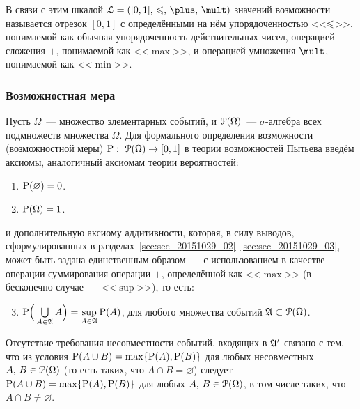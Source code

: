В связи с этим шкалой $\scL = \scale$ значений возможности называется отрезок $[0,1]$ с определёнными на нём упорядоченностью <<$\leqs$>>, понимаемой как обычная упорядоченность действительных чисел, операцией сложения $\plus$, понимаемой как <<$\max$>>, и операцией умножения $\mult$, понимаемой как <<$\min$>>.
\begin{comment}
Пусть ${\{a_1,\, a_2,\, \ldots\}\subset\scL}$~--- последовательность элементов $\scL$. Нижний $\liminf\limits_{i\to\infty} a_i$ и верхний $\limsup\limits_{i\to\infty} a_i$ пределы этой последовательности определяют следующим образом:
\begin{gather*}
    \dst\liminf_{i\to\infty} a_i = \sup_{n=1,\, 2,\, \ldots}\inf_{i\geqs n}a_i,\\
    \dst\limsup_{i\to\infty} a_i = \inf_{n=1,\, 2,\, \ldots}\sup_{i\geqs n}a_i.
\end{gather*}
Если $\liminf\limits_{i\to\infty} a_i = \limsup\limits_{i\to\infty} a_i$, последовательность $\{a_1,\, a_2,\, \ldots\}$ называется сходящейся, а её пределом называется элемент
$$\lim_{i\to\infty} a_i \defeq \liminf_{i\to\infty} a_i = \limsup_{i\to\infty} a_i.$$
\end{comment}

\subsubsection{Возможностная мера}

Пусть $\Omega$~--- множество элементарных событий, и $\Po(\Omega)$~--- $\sigma$-алгебра всех подмножеств множества $\Omega$.
Для формального определения возможности (возможностной меры) $\P:\ \Po(\Omega)\to[0,1]$ в теории возможностей Пытьева введём аксиомы, аналогичный аксиомам теории вероятностей:
\begin{enumerate}
\item\label{item_poss_rel_1}
    $\P(\varnothing) = 0$.
\item\label{item_poss_rel_2}
    $\P(\Omega) = 1$.
\end{enumerate}
и дополнительную аксиому аддитивности, которая, в силу выводов, сформулированных в разделах~\ref{sec:sec_20151029_02}--\ref{sec:sec_20151029_03}, может быть задана единственным образом~--- с использованием в качестве операции суммирования операции $\plus$, определённой как <<$\max$>> (в бесконечно случае~--- <<$\sup$>>), то есть:
\begin{enumerate}
\setcounter{enumi}{2}
\item $\P\Big(\bigcup\limits_{A\in\Alg} A\Big) = \sup\limits_{A\in\Alg}\P(A)$, для любого множества событий $\Alg\subset\Po(\Omega)$.
\end{enumerate}
Отсутствие требования несовместности событий, входящих в $\Alg'$ связано с тем, что из условия $\P(A\cup B) = \max\{\P(A),\P(B)\}$ для любых несовместных $A,\, B\in\Po(\Omega)$ (то есть таких, что $A\cap B=\varnothing$) следует $\P(A\cup B) = \max\{\P(A),\P(B)\}$ для любых $A,\, B\in\Po(\Omega)$, в том числе таких, что $A\cap B\ne\varnothing$.

